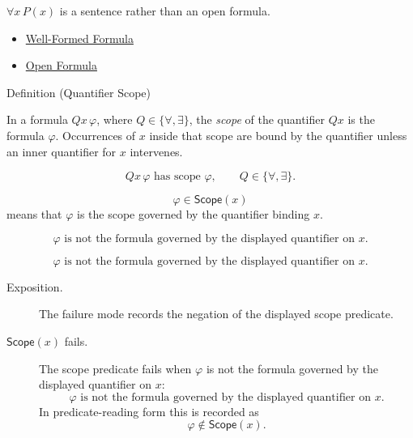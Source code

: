 \begin{remark*}
\(\forall x\,P(x)\) is a sentence rather than an open formula.
\end{remark*}

\begin{dependencies}
\begin{itemize}
  \item \hyperref[def:wff-pred]{Well-Formed Formula}
  \item \hyperref[def:predicate]{Open Formula}
\end{itemize}
\end{dependencies}

\begin{definitionbox}{Definition (Quantifier Scope)}
\begin{definition}
\label{def:quantifier-scope}
In a formula \(Qx\,\varphi\), where \(Q\in\{\forall,\exists\}\), the
\emph{scope} of the quantifier \(Qx\) is the formula \(\varphi\). Occurrences
of \(x\) inside that scope are bound by the quantifier unless an inner
quantifier for \(x\) intervenes.
\end{definition}
\end{definitionbox}

\begin{remark*}
\[
Qx\,\varphi \text{ has scope } \varphi,
\qquad
Q\in\{\forall,\exists\}.
\]
\end{remark*}

\begin{remark*}
\[
  \varphi\in\mathsf{Scope}(x)
\] means that \(\varphi\) is the scope governed
by the quantifier binding \(x\).
\end{remark*}

\begin{remark*}
\[
\varphi \text{ is not the formula governed by the displayed quantifier on } x.
\]
\end{remark*}

\begin{remark*}
\[
  \varphi \text{ is not the formula governed by the displayed quantifier on } x.
\]
\end{remark*}

\begin{remark*}
\begin{description}
  \item[Exposition.] The failure mode records the negation of the displayed
  scope predicate.
  \item[\(\mathsf{Scope}(x)\) fails.] The scope predicate fails when
  \(\varphi\) is not the formula governed by the displayed quantifier on \(x\):
  \[
  \varphi \text{ is not the formula governed by the displayed quantifier on } x.
  \]
  In predicate-reading form this is recorded as
  \[
  \varphi\notin\mathsf{Scope}(x).
  \]
\end{description}
\end{remark*}

